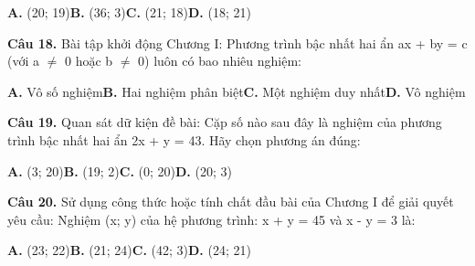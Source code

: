 \documentclass[11pt,a4paper]{article}
\begin{document}
\hspace*{1.5em}\textbf{A.} (20; 19)\quad\quad \textbf{B.} (36; 3)\quad\quad \textbf{C.} (21; 18)\quad\quad \textbf{D.} (18; 21)\par\vspace{2pt}
\textbf{\color{primary} Câu 18.} Bài tập khởi động Chương I: Phương trình bậc nhất hai ẩn ax + by = c (với a $\ne$ 0 hoặc b $\ne$ 0) luôn có bao nhiêu nghiệm:\par
\hspace*{1.5em}\textbf{A.} Vô số nghiệm\quad\quad \textbf{B.} Hai nghiệm phân biệt\quad\quad \textbf{C.} Một nghiệm duy nhất\quad\quad \textbf{D.} Vô nghiệm\par\vspace{2pt}
\textbf{\color{primary} Câu 19.} Quan sát dữ kiện đề bài: Cặp số nào sau đây là nghiệm của phương trình bậc nhất hai ẩn 2x + y = 43. Hãy chọn phương án đúng:\par
\hspace*{1.5em}\textbf{A.} (3; 20)\quad\quad \textbf{B.} (19; 2)\quad\quad \textbf{C.} (0; 20)\quad\quad \textbf{D.} (20; 3)\par\vspace{2pt}
\textbf{\color{primary} Câu 20.} Sử dụng công thức hoặc tính chất đầu bài của Chương I để giải quyết yêu cầu: Nghiệm (x; y) của hệ phương trình: x + y = 45 và x - y = 3 là:\par
\hspace*{1.5em}\textbf{A.} (23; 22)\quad\quad \textbf{B.} (21; 24)\quad\quad \textbf{C.} (42; 3)\quad\quad \textbf{D.} (24; 21)\par\vspace{2pt}
\end{document}
